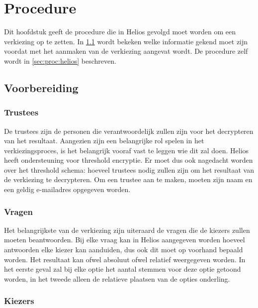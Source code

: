 % 
%

\chapter{Procedure}
\label{chap:procedure}

Dit hoofdstuk geeft de procedure die in Helios gevolgd moet worden om een verkiezing op te zetten. In \ref{sec:proc:voorbereiding} wordt bekeken welke informatie gekend moet zijn voordat met het aanmaken van de verkiezing aangevat wordt. De procedure zelf wordt in \ref{sec:proc:helios} beschreven.

\section{Voorbereiding}
\label{sec:proc:voorbereiding}

\subsection{Trustees}


De trustees zijn de personen die verantwoordelijk zullen zijn voor het decrypteren van het resultaat. Aangezien zijn een belangrijke rol spelen in het verkiezingsproces, is het belangrijk vooraf vast te leggen wie dit zal doen. Helios heeft ondersteuning voor threshold encryptie. Er moet dus ook nagedacht worden over het threshold schema: hoeveel trustees nodig zullen zijn om het resultaat van de verkiezing te decrypteren. Om een trustee aan te maken, moeten zijn naam en een geldig e-mailadres opgegeven worden.

\subsection{Vragen}
\label{sec:proc:voorbereiding:vragen}

Het belangrijkste van de verkiezing zijn uiteraard de vragen die de kiezers zullen moeten beantwoorden. Bij elke vraag kan in Helios aangegeven worden hoeveel antwoorden elke kiezer kan aanduiden, dus ook dit moet op voorhand bepaald worden. Het resultaat kan ofwel absoluut ofwel relatief weergegeven worden. In het eerste geval zal bij elke optie het aantal stemmen voor deze optie getoond worden, in het tweede alleen de relatieve plaatsen van de opties onderling.

\subsection{Kiezers}
\label{sec:proc:voorbereiding:kiezers}

